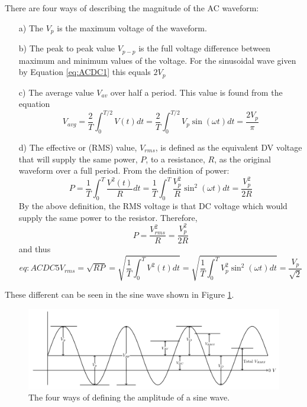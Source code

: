 \documentclass[12pt, a4paper, oneside, openright, titlepage]{book}
\begin{document}
\noindent There are four ways of describing the magnitude of the AC waveform:
\begin{itemize}
    \item[a)] The  $V_p$ is the maximum voltage of the waveform. 
    \item[b)] The peak to peak value $V_{p-p}$ is the full voltage difference between maximum and minimum values of the voltage. For the sinusoidal wave given by Equation \ref{eq:ACDC1} this equals $2V_p$
    \item[c)] The average value $V_{av}$ over half a period. This value is found from the equation \begin{equation}\label{eq:ACDC2}
            V_{avg} = \frac{2}{T}\int_0^{T/2}V(t)dt = \frac{2}{T}\int_0^{T/2}V_p\sin(\omega t)dt = \frac{2V_p}{\pi}
    \end{equation}
    \item[d)] The effective or  (RMS) value, $V_{rms}$, is defined as the equivalent DV voltage that will supply the same power, $P$, to a resistance, $R$, as the original waveform over a full period. From the definition of power:\begin{equation}\label{eq:ACDC3}
            P=\frac{1}{T}\int_0^T\frac{V^2(t)}{R}dt = \frac{1}{T}\int_0^T\frac{V_p^2}{R}\sin^2(\omega t)dt = \frac{V_p^2}{2R}
    \end{equation}
        By the above definition, the RMS voltage is that DC voltage which would supply the same power to the resistor. Therefore, \begin{equation}\label{eq:ACDC4}
            P = \frac{V_{rms}^2}{R} = \frac{V_p^2}{2R}
        \end{equation}
        and thus \begin{equation}{eq:ACDC5}
            V_{rms} = \sqrt{RP} = \sqrt{\frac{1}{T}\int_0^TV^2(t)dt} = \sqrt{\frac{1}{T}\int_0^TV_p^2\sin^2(\omega t)dt} = \frac{V_p}{\sqrt{2}}
        \end{equation}
\end{itemize}

\noindent These different  can be seen in the sine wave shown in Figure \ref{fig:ACDC4}.

\begin{figure}[H]
    \centering
    \includegraphics[scale = 0.7]{Images/ACDC3.PNG}
    \caption{The four ways of defining the amplitude of a sine wave.}
    \label{fig:ACDC4}
\end{figure}
\end{document}
